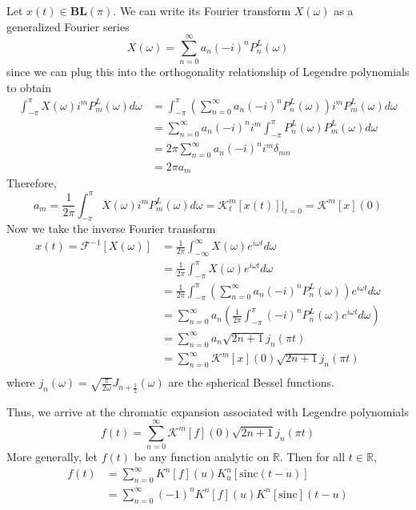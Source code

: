 \documentclass[11pt,oneside]{book}
\theoremstyle{plain}
\theoremstyle{definition}
\theoremstyle{remark}
\begin{document}
Let $x(t) \in \mathbf{BL}(\pi)$. We can write its Fourier transform $X(\omega)$ as a 
generalized Fourier series
\begin{equation*}
  X(\omega) = \sum_{n=0}^{\infty} a_n (-i)^n P_n^L(\omega)
\end{equation*}
since we can plug this into the orthogonality relationship of Legendre polynomials to obtain
\begin{align*}
  \int_{-\pi}^{\pi} X(\omega) i^m P_m^L(\omega) d\omega 
    &= \int_{-\pi}^{\pi} \left ( \sum_{n=0}^{\infty} a_n (-i)^n P_n^L(\omega) \right ) i^m P_m^L(\omega) d\omega \\
    &= \sum_{n=0}^{\infty} a_n (-i)^n  i^m \int_{-\pi}^{\pi} P_n^L(\omega) P_m^L(\omega) d\omega \\
    &= 2 \pi \sum_{n=0}^{\infty} a_n (-i)^n  i^m \delta_{mn} \\
    &= 2 \pi a_m
\end{align*}
Therefore, 
\begin{equation*}
  a_m = \frac{1}{2\pi} \int_{-\pi}^{\pi} X(\omega) i^m P_m^L(\omega) d\omega 
      = \mathcal{K}_t^m[x(t)] |_{t=0} = \mathcal{K}^m[x](0)
\end{equation*}
Now we take the inverse Fourier transform
\begin{align*}
  x(t) = \mathcal{F}^{-1}[X(\omega)] 
      &= \frac{1}{2 \pi} \int_{-\infty}^{\infty} X(\omega) e^{i \omega t} d\omega \\
      &= \frac{1}{2 \pi} \int_{-\pi}^{\pi} X(\omega) e^{i \omega t} d\omega \\
      &= \frac{1}{2 \pi} \int_{-\pi}^{\pi} \left ( \sum_{n=0}^{\infty} a_n (-i)^n P_n^L(\omega) \right ) e^{i \omega t} d\omega \\
      &= \sum_{n=0}^{\infty} a_n \left ( \frac{1}{2 \pi} \int_{-\pi}^{\pi} (-i)^n P_n^L(\omega) e^{i \omega t} d\omega \right ) \\
      &= \sum_{n=0}^{\infty} a_n \sqrt{2n+1} j_n(\pi t) \\
      &= \sum_{n=0}^{\infty} \mathcal{K}^m[x](0) \sqrt{2n+1} j_n(\pi t) \\
\end{align*}
where $j_n(\omega) = \sqrt{\frac{\pi}{2\omega}} J_{n+\frac{1}{2}}(\omega)$ are the spherical Bessel functions.

Thus, we arrive at the chromatic expansion associated with Legendre polynomials
\begin{equation}
  f(t) = \sum_{n=0}^{\infty} \mathcal{K}^m[f](0) \sqrt{2n+1} j_n(\pi t)
\end{equation}
More generally, let $f(t)$ be any function analytic on $\mathbb{R}$. Then for all $t\in\mathbb{R}$,
\begin{align}
  f(t) &= \sum_{n=0}^{\infty} K^n[f](u) K_u^n[\mathrm{sinc}(t-u)] \\
       &= \sum_{n=0}^{\infty} (-1)^n K^n[f](u) K^n[\mathrm{sinc}](t-u)
\end{align}
\end{document}
